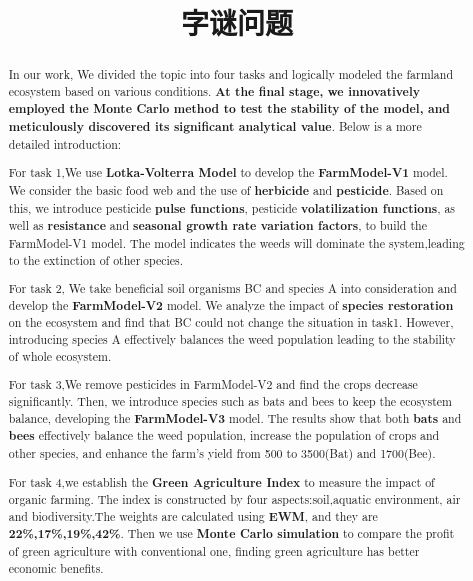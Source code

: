 \documentclass[12pt]{article}  %
\title{字谜问题}  %
\begin{document}
\begin{abstract}
    In our work, We divided the topic into four tasks and logically modeled 
    the farmland ecosystem based 
    on various conditions. \textbf{At the final stage, we innovatively employed 
    the Monte Carlo method to test the stability of the model, and meticulously 
    discovered its significant analytical value}. Below is a more detailed 
    introduction:

For task 1,We use \textbf{Lotka-Volterra Model} to develop the \textbf{FarmModel-V1} model. 
We consider the basic food web and the use of \textbf{herbicide} and \textbf{pesticide}. 
Based on this, we introduce pesticide \textbf{pulse functions}, pesticide 
\textbf{volatilization functions}, as well as \textbf{resistance} and \textbf{seasonal growth 
rate variation factors}, to build the FarmModel-V1 model. The model 
indicates the weeds will dominate the system,leading to the extinction
 of other species.

For task 2, We take beneficial soil organisms BC and species A into 
consideration and develop the \textbf{FarmModel-V2} model. We analyze the impact 
of \textbf{species restoration} on the ecosystem and find that BC could not change
 the situation in task1. However, introducing species A effectively 
 balances the weed population leading to the stability of whole ecosystem.

For task 3,We remove pesticides in FarmModel-V2 and find the crops decrease 
significantly. Then, we introduce  species such as bats and bees to
 keep the ecosystem balance, developing the \textbf{FarmModel-V3} model. The 
 results show that both \textbf{bats} and \textbf{bees} effectively balance the weed 
 population, increase the population of crops and other species, and 
 enhance the farm's yield from 500 to 3500(Bat) and 1700(Bee).

For task 4,we establish the \textbf{Green Agriculture Index} to measure the 
impact of organic farming. The index is constructed by four 
aspects:soil,aquatic environment, air and biodiversity.The 
weights are calculated using \textbf{EWM}, and they are \textbf{22\%,17\%,19\%,42\%}.
Then we use \textbf{Monte Carlo simulation} to compare the profit of green 
agriculture with conventional one, finding green agriculture has
 better economic benefits.


\end{abstract}
\end{document}
